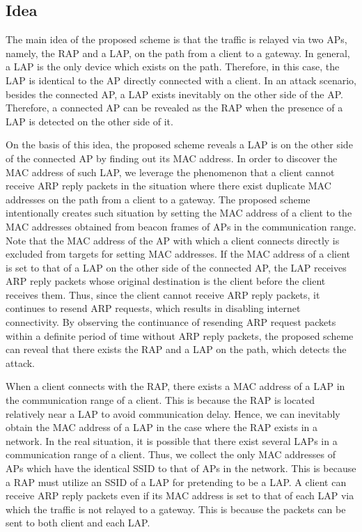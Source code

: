 \documentclass[conference]{IEEEtran}
\begin{document}
\subsection{Idea}
The main idea of the proposed scheme is that the traffic is relayed via two APs, namely, the RAP and a LAP, on the path from a client to a gateway.
In general, a LAP is the only device which exists on the path.
Therefore, in this case, the LAP is identical to the AP directly connected with a client.
In an attack scenario, besides the connected AP, a LAP exists inevitably on the other side of the AP.
Therefore, a connected AP can be revealed as the RAP when the presence of a LAP is detected on the other side of it.

On the basis of this idea, the proposed scheme reveals a LAP is on the other side of the connected AP by finding out its MAC address.
In order to discover the MAC address of such LAP, we leverage the phenomenon that a client cannot receive ARP reply packets in the situation where there exist duplicate MAC addresses on the path from a client to a gateway.
The proposed scheme intentionally creates such situation by setting the MAC address of a client to the MAC addresses obtained from beacon frames of APs in the communication range.
Note that the MAC address of the AP with which a client connects directly is excluded from targets for setting MAC addresses.
If the MAC address of a client is set to that of a LAP on the other side of the connected AP, the LAP receives ARP reply packets whose original destination is the client before the client receives them.
Thus, since the client cannot receive ARP reply packets, it continues to resend ARP requests, which results in disabling internet connectivity.
By observing the continuance of resending ARP request packets within a definite period of time without ARP reply packets, the proposed scheme can reveal that there exists the RAP and a LAP on the path, which detects the attack. %

When a client connects with the RAP, there exists a MAC address of a LAP in the communication range of a client.
This is because the RAP is located relatively near a LAP to avoid communication delay.
Hence, we can inevitably obtain the MAC address of a LAP in the case where the RAP exists in a network.
In the real situation, it is possible that there exist several LAPs in a communication range of a client.
Thus, we collect the only MAC addresses of APs which have the identical SSID to that of APs in the network.
This is because a RAP must utilize an SSID of a LAP for pretending to be a LAP.
A client can receive ARP reply packets even if its MAC address is set to that of each LAP via which the traffic is not relayed to a gateway.
This is because the packets can be sent to both client and each LAP.
\end{document}
